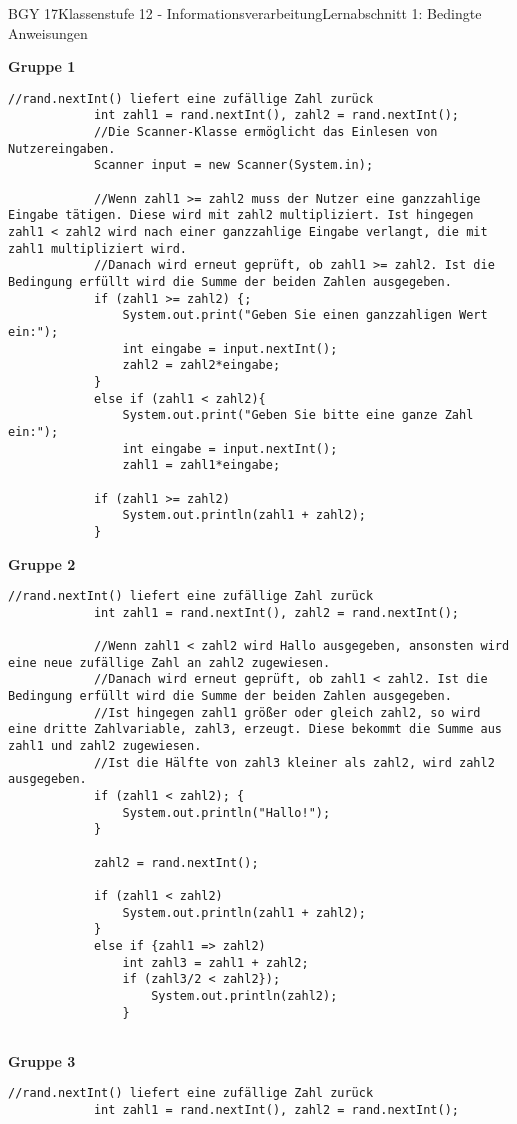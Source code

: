 \documentclass[oneside,openany,headings=optiontotoc,11pt,numbers=noenddot]{scrreprt}
\begin{document}
	\begin{worksheet}{BGY 17}{Klassenstufe 12 - Informationsverarbeitung}{Lernabschnitt 1: Bedingte Anweisungen}
				
		\noindent
		\sffamily
		\pagestyle{empty}
		\textbf{Gruppe 1}
		\begin{lstlisting}[style=JavaInputStyle]
			//rand.nextInt() liefert eine zufällige Zahl zurück
			int zahl1 = rand.nextInt(), zahl2 = rand.nextInt();
			//Die Scanner-Klasse ermöglicht das Einlesen von Nutzereingaben.
			Scanner input = new Scanner(System.in);
			
			//Wenn zahl1 >= zahl2 muss der Nutzer eine ganzzahlige Eingabe tätigen. Diese wird mit zahl2 multipliziert. Ist hingegen zahl1 < zahl2 wird nach einer ganzzahlige Eingabe verlangt, die mit zahl1 multipliziert wird.
			//Danach wird erneut geprüft, ob zahl1 >= zahl2. Ist die Bedingung erfüllt wird die Summe der beiden Zahlen ausgegeben.
			if (zahl1 >= zahl2) {;
				System.out.print("Geben Sie einen ganzzahligen Wert ein:");
				int eingabe = input.nextInt();
				zahl2 = zahl2*eingabe;
			}
			else if (zahl1 < zahl2){
				System.out.print("Geben Sie bitte eine ganze Zahl ein:");
				int eingabe = input.nextInt();
				zahl1 = zahl1*eingabe;
				
			if (zahl1 >= zahl2)
				System.out.println(zahl1 + zahl2);
			}
		\end{lstlisting}
		\newpage
		\textbf{Gruppe 2}
		\begin{lstlisting}[style=JavaInputStyle]
			//rand.nextInt() liefert eine zufällige Zahl zurück
			int zahl1 = rand.nextInt(), zahl2 = rand.nextInt();
			
			//Wenn zahl1 < zahl2 wird Hallo ausgegeben, ansonsten wird eine neue zufällige Zahl an zahl2 zugewiesen.
			//Danach wird erneut geprüft, ob zahl1 < zahl2. Ist die Bedingung erfüllt wird die Summe der beiden Zahlen ausgegeben.
			//Ist hingegen zahl1 größer oder gleich zahl2, so wird eine dritte Zahlvariable, zahl3, erzeugt. Diese bekommt die Summe aus zahl1 und zahl2 zugewiesen.
			//Ist die Hälfte von zahl3 kleiner als zahl2, wird zahl2 ausgegeben.
			if (zahl1 < zahl2); {
				System.out.println("Hallo!");
			}
			
			zahl2 = rand.nextInt();
			
			if (zahl1 < zahl2)
				System.out.println(zahl1 + zahl2);
			}
			else if {zahl1 => zahl2) 
				int zahl3 = zahl1 + zahl2;
				if (zahl3/2 < zahl2});
					System.out.println(zahl2);
				}
			
		\end{lstlisting}
		\newpage
		\textbf{Gruppe 3}
		\begin{lstlisting}[style=JavaInputStyle]
			//rand.nextInt() liefert eine zufällige Zahl zurück
			int zahl1 = rand.nextInt(), zahl2 = rand.nextInt();
			

\end{lstlisting}
\end{worksheet}
\end{document}

